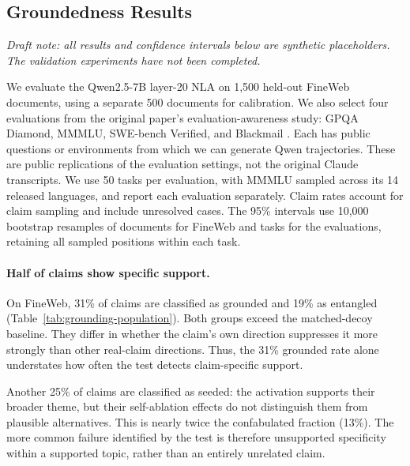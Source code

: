 
\subsection{Groundedness Results}
\label{sec:groundedness-results}

\noindent\textit{Draft note: all results and confidence intervals below are
synthetic placeholders. The validation experiments have not been completed.}

We evaluate the Qwen2.5-7B layer-20 NLA on 1,500 held-out FineWeb documents,
using a separate 500 documents for calibration. We also select four evaluations
from the original paper's evaluation-awareness study: GPQA Diamond, MMMLU,
SWE-bench Verified, and Blackmail \citep{frasertaliente2026nla}. Each has public
questions or environments from which we can generate Qwen trajectories. These
are public replications of the evaluation settings, not the original Claude
transcripts. We use 50 tasks per evaluation, with MMMLU sampled across its
14 released languages, and report each evaluation separately.
Claim rates account for claim sampling and include unresolved cases. The
95\% intervals use 10,000 bootstrap resamples of documents for FineWeb and
tasks for the evaluations, retaining all sampled positions within each task.

\paragraph{Half of claims show specific support.}
On FineWeb, 31\% of claims are classified as grounded and 19\% as entangled
(Table~\ref{tab:grounding-population}). Both groups exceed the matched-decoy
baseline. They differ in whether the claim's own direction suppresses it more
strongly than other real-claim directions. Thus, the 31\% grounded rate alone
understates how often the test detects claim-specific support.

Another 25\% of claims are classified as seeded: the activation supports their
broader theme, but their self-ablation effects do not distinguish them from
plausible alternatives. This is nearly twice the confabulated fraction (13\%).
The more common failure identified by the test is therefore unsupported
specificity within a supported topic, rather than an entirely unrelated claim.

